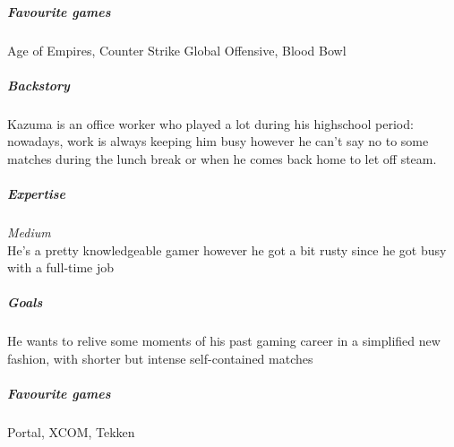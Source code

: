 \subparagraph{Favourite games}
Age of Empires, Counter Strike Global Offensive, Blood Bowl

\vspace{5mm}



\subparagraph{Backstory}
Kazuma is an office worker who played a lot during his highschool period: nowadays, work is always keeping him busy however he can't say no to some matches during the lunch break or when he comes back home to let off steam.

\subparagraph{Expertise}
\textit{Medium} \\ 
He's a pretty knowledgeable gamer however he got a bit rusty since he got busy with a full-time job

\subparagraph{Goals}
He wants to relive some moments of his past gaming career in a simplified new fashion, with shorter but intense self-contained matches

\subparagraph{Favourite games}
Portal, XCOM, Tekken 

\clearpage
